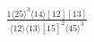 \documentclass[varwidth, border=5pt]{standalone}
\begin{document}
\begin{my}
$\begin{gathered}
\scriptscriptstyle\frac{1⟨25⟩^3⟨14⟩[12][13]}{⟨12⟩⟨13⟩[15]^2⟨45⟩^3}
\end{gathered}$
\end{my}
\end{document}
